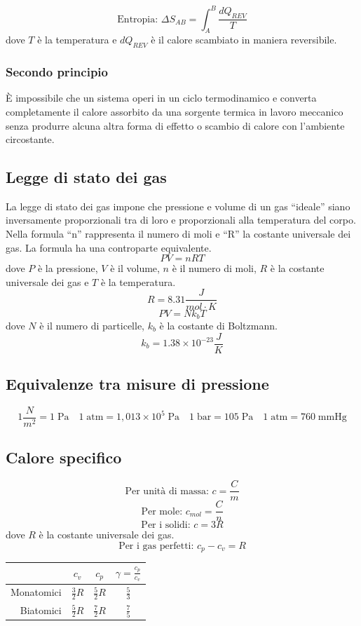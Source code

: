 \documentclass[a4paper]{article}
\theoremstyle{break}
\theoremstyle{break}
\theoremstyle{break}
\theoremstyle{break}
\begin{document}
\[
  \text{Entropia: } \Delta S_{AB} = \int_A^B \frac{dQ_{REV}}{T}
\] 
dove \( T \) è la temperatura e \( dQ_{REV} \) è il calore scambiato in maniera reversibile.

\subsubsection{Secondo principio}
È impossibile che un sistema operi in un ciclo termodinamico e converta completamente il calore
assorbito da una sorgente termica in lavoro meccanico senza produrre alcuna altra forma di effetto
o scambio di calore con l'ambiente circostante.

\subsection{Legge di stato dei gas}
La legge di stato dei gas impone che pressione e volume di un gas “ideale” siano inversamente
proporzionali tra di loro e proporzionali alla temperatura del corpo. Nella formula “n” rappresenta il
numero di moli e “R” la costante universale dei gas. La formula ha una controparte equivalente.
\[
  PV = nRT
\]
dove \( P \) è la pressione, \( V \) è il volume, \( n \) è il numero di moli, \( R \) è la costante universale dei gas e \( T \) è la temperatura.
\[
  R = 8.31 \frac{J}{mol \cdot K}
\] 
\[
PV = Nk_bT
\] 
dove \( N \) è il numero di particelle, \( k_b \) è la costante di Boltzmann.
\[
  k_b = 1.38 \times 10^{-23} \frac{J}{K}
\] 

\subsection{Equivalenze tra misure di pressione}
\[
1 \frac{N}{m^2} = 1\; \text{Pa} \quad 1\; \text{atm} = 1,013 \times 10^5\; \text{Pa} \quad
1 \;\text{bar} = 105 \;\text{Pa} \quad 1 \;\text{atm} = 760 \;\text{mmHg}
\] 

\subsection{Calore specifico}
\[
  \text{Per unità di massa: }  c = \frac{C}{m}
\] 
\[
  \text{Per mole: } c_{mol} = \frac{C}{n}
\] 
\[
\text{Per i solidi: } c = 3R
\] 
dove \( R \) è la costante universale dei gas.
\[
\text{Per i gas perfetti: } c_p - c_v = R
\] 
\begin{table}[H]
  \centering
  \begin{tabular}{r|c|c|c}
    & \( c_v \) & \( c_p \) & \( \gamma = \frac{c_p}{c_v} \) \\[0.2cm]
    \hline
    Monatomici & \( \frac{3}{2} R \) & \( \frac{5}{2} R \) & \(\frac{5}{3}\) \\[0.2cm]
    Biatomici & \( \frac{5}{2} R \) & \( \frac{7}{2} R \) & \(\frac{7}{5}\) \\
  \end{tabular}
\end{table}
\end{document}
